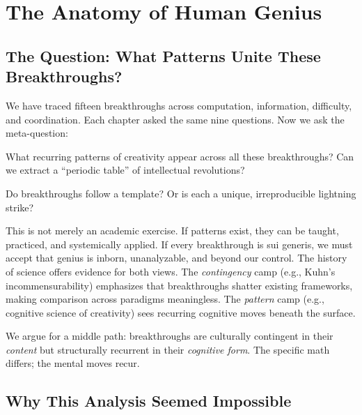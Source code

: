
\chapter{The Anatomy of Human Genius}
\label{ch:anatomy}

\section{The Question: What Patterns Unite These Breakthroughs?}
\label{sec:anatomy:question}

We have traced fifteen breakthroughs across computation, information, difficulty, and coordination. Each chapter asked the same nine questions. Now we ask the meta-question:

What recurring patterns of creativity appear across all these breakthroughs? Can we extract a ``periodic table'' of intellectual revolutions?

Do breakthroughs follow a template? Or is each a unique, irreproducible lightning strike?

This is not merely an academic exercise. If patterns exist, they can be taught, practiced, and systemically applied. If every breakthrough is sui generis, we must accept that genius is inborn, unanalyzable, and beyond our control. The history of science offers evidence for both views. The \emph{contingency} camp (e.g., Kuhn's incommensurability) emphasizes that breakthroughs shatter existing frameworks, making comparison across paradigms meaningless. The \emph{pattern} camp (e.g., cognitive science of creativity) sees recurring cognitive moves beneath the surface.

We argue for a middle path: breakthroughs are culturally contingent in their \emph{content} but structurally recurrent in their \emph{cognitive form}. The specific math differs; the mental moves recur.

\section{Why This Analysis Seemed Impossible}
\label{sec:anatomy:impossible}

